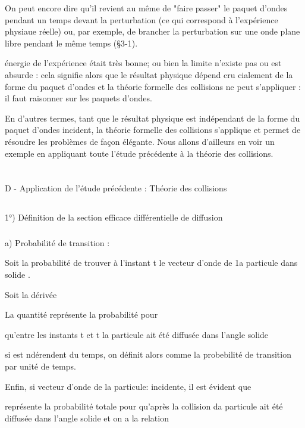  On peut encore dire qu'il revient au même de "faire passer" le paquet
d'ondes pendant un temps  devant la perturbation (ce qui correspond
à l'expérience physiaue réelle) ou, par exemple, de brancher la perturbation sur
une onde plane libre pendant le même temps (\S 3-1).

 

énergie de l'expérience était très bonne; ou bien la limite n'existe pas
ou est absurde : cela signifie alors que le résultat physique dépend cru
cialement de la forme du paquet d'ondes et la théorie formelle des collisions
ne peut s'appliquer : il faut raisonner sur les paquets d'ondes.

En d'autres termes, tant que le résultat physique est indépendant de la
forme du paquet d'ondes incident, la théorie formelle des collisions
s'applique et permet de résoudre les problèmes de façon élégante. Nous
allons d'ailleurs en voir un exemple en appliquant toute l'étude précédente à la
théorie des collisions.

\section{}%
D - Application de l'étude précédente : Théorie des collisions
\subsection{}%
1°) Définition de la section efficace différentielle de diffusion

\subsubsection{}%
a) Probabilité de transition :

Soit  la probabilité de trouver à l'instant t le
vecteur d'onde de 1a particule dans  solide .

Soit  la dérivée 

La quantité  représente la probabilité pour

qu'entre les instants t et t  la particule ait été diffusée dans
l'angle solide 

si  est ndérendent du temps, on définit alors 
comme la probebilité  de transition par unité de temps.

Enfin, si  vecteur d'onde de la particule: incidente, il
est évident que 

 représente la probabilité totale pour qu'après
la collision da particule ait été diffusée dans l'angle solide 
et on a la relation

